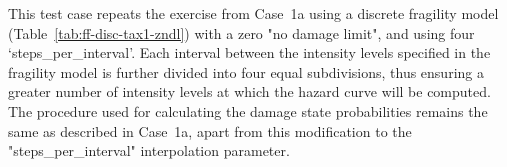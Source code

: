 This test case repeats the exercise from Case~1a using a discrete fragility model (Table~\ref{tab:ff-disc-tax1-zndl}) with a zero "no damage limit", and using four `steps\_per\_interval'. Each interval between the intensity levels specified in the fragility model is further divided into four equal subdivisions, thus ensuring a greater number of intensity levels at which the hazard curve will be computed. The procedure used for calculating the damage state probabilities remains the same as described in Case~1a, apart from this modification to the "steps\_per\_interval" interpolation parameter.